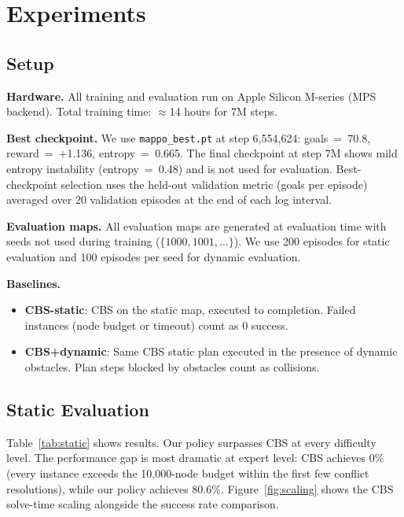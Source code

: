\documentclass[letterpaper,twocolumn,10pt]{article}
\begin{document}
\section{Experiments}

\subsection{Setup}

\textbf{Hardware.} All training and evaluation run on Apple Silicon M-series (MPS
backend). Total training time: $\approx$14 hours for 7M steps.

\textbf{Best checkpoint.} We use \texttt{mappo\_best.pt} at step 6,554,624:
goals~=~70.8, reward~=~+1.136, entropy~=~0.665. The final checkpoint at step 7M
shows mild entropy instability (entropy~=~0.48) and is not used for evaluation.
Best-checkpoint selection uses the held-out validation metric (goals per episode)
averaged over 20 validation episodes at the end of each log interval.

\textbf{Evaluation maps.} All evaluation maps are generated at evaluation time with
seeds not used during training ($\{1000, 1001, \ldots\}$). We use 200 episodes
for static evaluation and 100 episodes per seed for dynamic evaluation.

\textbf{Baselines.}
\begin{itemize}[leftmargin=*,itemsep=2pt,topsep=2pt]
  \item \textbf{CBS-static}: CBS on the static map, executed to completion.
    Failed instances (node budget or timeout) count as 0 success.
  \item \textbf{CBS+dynamic}: Same CBS static plan executed in the presence of
    dynamic obstacles. Plan steps blocked by obstacles count as collisions.
\end{itemize}

\subsection{Static Evaluation}

Table~\ref{tab:static} shows results. Our policy surpasses CBS at every difficulty
level. The performance gap is most dramatic at expert level: CBS achieves 0\%
(every instance exceeds the 10,000-node budget within the first few conflict resolutions),
while our policy achieves 80.6\%. Figure~\ref{fig:scaling} shows the CBS solve-time
scaling alongside the success rate comparison.
\end{document}
